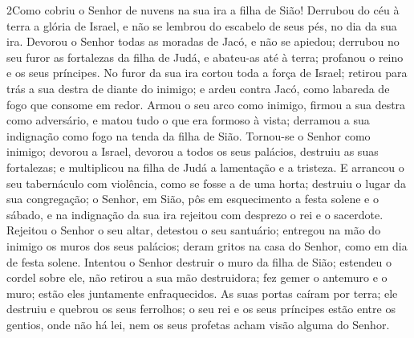 \lettrine{2} Como cobriu o Senhor de nuvens na sua ira a filha
de Sião! Derrubou do céu à terra a glória de Israel, e não se
lembrou do escabelo de seus pés, no dia da sua ira. Devorou o
Senhor todas as moradas de Jacó, e não se apiedou; derrubou no seu
furor as fortalezas da filha de Judá, e abateu-as até à terra;
profanou o reino e os seus príncipes. No furor da sua ira cortou
toda a força de Israel; retirou para trás a sua destra de diante do
inimigo; e ardeu contra Jacó, como labareda de fogo que consome em
redor. Armou o seu arco como inimigo, firmou a sua destra como
adversário, e matou tudo o que era formoso à vista; derramou a sua
indignação como fogo na tenda da filha de Sião. Tornou-se o
Senhor como inimigo; devorou a Israel, devorou a todos os seus
palácios, destruiu as suas fortalezas; e multiplicou na filha de
Judá a lamentação e a tristeza. E arrancou o seu tabernáculo com
violência, como se fosse a de uma horta; destruiu o lugar da sua
congregação; o Senhor, em Sião, pôs em esquecimento a festa solene e
o sábado, e na indignação da sua ira rejeitou com desprezo o rei e o
sacerdote. Rejeitou o Senhor o seu altar, detestou o seu
santuário; entregou na mão do inimigo os muros dos seus palácios;
deram gritos na casa do Senhor, como em dia de festa solene.
Intentou o Senhor  destruir o muro da filha de Sião; estendeu o
cordel sobre ele, não retirou a sua mão destruidora; fez gemer o
antemuro e o muro; estão eles juntamente enfraquecidos. As suas
portas caíram por terra; ele destruiu e quebrou os seus ferrolhos; o
seu rei e os seus príncipes estão entre os gentios, onde não há lei,
nem os seus profetas acham visão alguma do Senhor.

